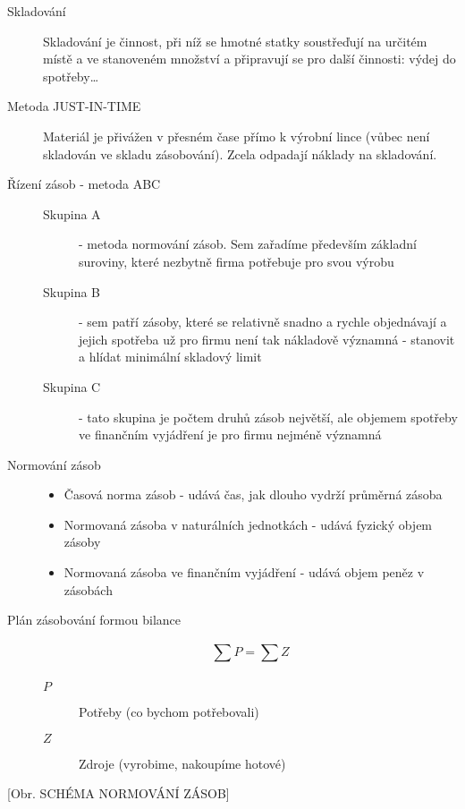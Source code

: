 \begin{description}
    \item[Skladování] Skladování je činnost, při níž se hmotné statky soustřeďují na určitém místě a ve stanoveném množství a připravují se pro další činnosti: výdej do spotřeby\ldots
    \item[Metoda JUST-IN-TIME] Materiál je přivážen v přesném čase přímo k výrobní lince (vůbec není skladován ve skladu zásobování). Zcela odpadají náklady na skladování.
    \item[Řízení zásob - metoda ABC]
        \begin{description}
            \item[Skupina A] - metoda normování zásob. Sem zařadíme především základní suroviny, které nezbytně firma potřebuje pro svou výrobu
            \item[Skupina B] - sem patří zásoby, které se relativně snadno a rychle objednávají a jejich spotřeba už pro firmu není tak nákladově významná
            - stanovit a hlídat minimální skladový limit
            \item[Skupina C] - tato skupina je počtem druhů zásob největší, ale objemem spotřeby ve finančním vyjádření je pro firmu nejméně významná
        \end{description}
    \item[Normování zásob]
        \begin{itemize}
            \item Časová norma zásob - udává čas, jak dlouho vydrží průměrná zásoba
            \item Normovaná zásoba v naturálních jednotkách - udává fyzický objem zásoby
            \item Normovaná zásoba ve finančním vyjádření - udává objem peněz v zásobách
        \end{itemize}
    \item[Plán zásobování formou bilance]
        \begin{equation*}
            \sum_{}^{} P = \sum_{}^{} Z
        \end{equation*}
        \begin{description}
            \item[$P$] Potřeby (co bychom potřebovali)
            \item[$Z$] Zdroje (vyrobime, nakoupíme hotové)			
        \end{description}
\end{description}

[Obr. SCHÉMA NORMOVÁNÍ ZÁSOB]

